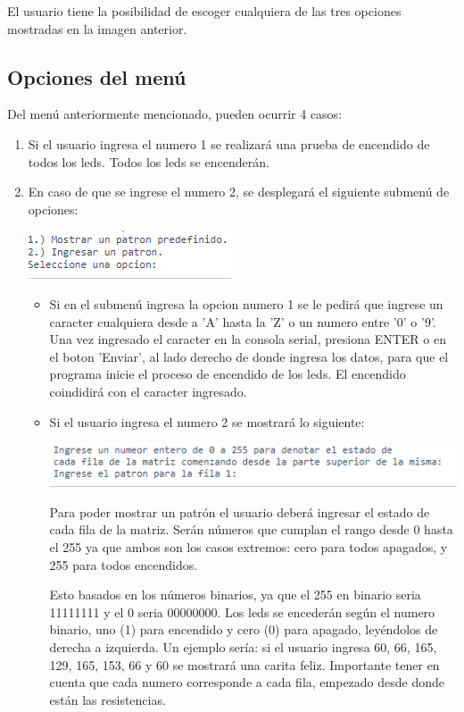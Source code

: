 \documentclass{article}
\begin{document}
El usuario tiene la posibilidad de escoger cualquiera de las tres opciones mostradas en  la imagen anterior. 

\subsection{Opciones del menú}
Del menú anteriormente mencionado, pueden ocurrir 4 casos:

\begin{enumerate}
    \item 
    Si el usuario ingresa el numero 1 se realizará una prueba de encendido de todos los leds. Todos los leds se encenderán. 
    \item
    En caso de que se ingrese el numero 2, se desplegará el siguiente submenú de opciones:
    
    \includegraphics[scale=1]{images/Submenu.png}
    \begin{itemize}
        \item 
        Si en el submenú ingresa la opcion numero 1 se le pedirá que ingrese un caracter cualquiera desde a 'A' hasta la 'Z' o un numero entre '0' o '9'. 
        Una vez ingresado el caracter en la consola serial, presiona ENTER o en el boton 'Enviar', al lado derecho de donde ingresa los datos, para que el programa inicie el proceso de encendido de los leds. 
        El encendido coindidirá con el caracter ingresado.
        \item
        Si el usuario ingresa el numero 2 se mostrará lo siguiente:
        
        \includegraphics[scale=0.9]{images/SubMenuOpc2.png}
        
        Para poder mostrar un patrón el usuario deberá ingresar el estado de cada fila de la matriz. Serán números que cumplan el rango desde 0 hasta el 255 ya que ambos son los casos extremos: cero para todos apagados, y 255 para todos encendidos. 
        \newline
        
        Esto basados en los números binarios, ya que el 255 en binario seria 11111111 y el 0 seria 00000000. Los leds se encederán según el numero binario, uno (1) para encendido y cero (0) para apagado, leyéndolos de derecha a izquierda. 
        Un ejemplo sería: 
        si el usuario ingresa 60, 66, 165, 129, 165, 153, 66 y 60 se mostrará una carita feliz. Importante tener en cuenta que cada numero corresponde a cada fila, empezado desde donde están las resistencias. 
        \newline
        

\end{itemize}
\end{enumerate}
\end{document}
